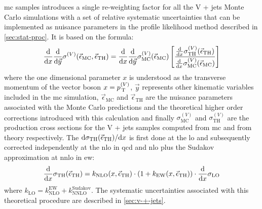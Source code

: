 \gls{mc} samples introduces a single re-weighting factor for all the V + jets
Monte Carlo simulations with a set of relative systematic uncertainties that can
be implemented as nuisance parameters in the profile likelihood method described
in \cref{sec:stat-proc}. It is based on the formula:
\begin{equation}
  \label{eq:51}
  \frac{\mathrm{d}}{\mathrm{d} x} \frac{\mathrm{d}}{\mathrm{d} \vec{y}} \sigma^{(V)}
  (\vec{\epsilon}_\mathrm{MC}, \vec{\epsilon}_\mathrm{TH}) = \frac{\mathrm{d}}{\mathrm{d} x}
  \frac{\mathrm{d}}{\mathrm{d} \vec{y}} \sigma_\mathrm{MC}^{(V)}(\vec{\epsilon}_\mathrm{MC})
  \left[ \frac{\frac{\mathrm{d}}{\mathrm{d} x}
      \sigma_\mathrm{TH}^{(V)}(\vec{\epsilon}_\mathrm{TH})}{\frac{\mathrm{d}}{\mathrm{d} x}
      \sigma_\mathrm{MC}^{(V)}(\vec{\epsilon}_\mathrm{MC})} \right]
\end{equation}
where the one dimensional parameter $x$ is understood as the transverse momentum
of the vector boson $x = p_\mathrm{\, T}^{(V)}$, $\vec{y}$ represents other kinematic
variables included in the \gls{mc} simulation, $\vec{\epsilon}_\mathrm{MC}$ and
$\vec{\epsilon}_\mathrm{TH}$ are the nuisance parameters associated with the
Monte Carlo predictions and the theoretical higher order corrections introduced
with this calculation and finally $\sigma_\mathrm{MC}^{(V)}$ and
$\sigma_\mathrm{TH}^{(V)}$ are the production cross sections for the V + jets
samples computed from \gls{mc} and from theory respectively. The
$\mathrm{d} \sigma_\mathrm{TH}(\vec{\epsilon}_\mathrm{TH})/\mathrm{d} x$ is first done at the
\gls{lo} and subsequently corrected independently at the \gls{nlo} in \gls{qcd}
and \gls{nlo} plus the Sudakov approximation at \gls{nnlo} in \gls{ew}:
\begin{equation}
  \label{eq:176}
  \frac{\mathrm{d}}{\mathrm{d} x} \sigma_\mathrm{TH}(\vec{\epsilon}_\mathrm{TH}) =
  k_\mathrm{NLO}(x, \vec{\epsilon}_\mathrm{TH}) \cdot \left(1 + k_\mathrm{EW}(x,
    \vec{\epsilon}_\mathrm{TH}) \right) \cdot \frac{\mathrm{d}}{\mathrm{d} x} \sigma_\mathrm{LO}
\end{equation}
where $k_\mathrm{LO} = k_\mathrm{NLO}^\mathrm{EW} +
k_\mathrm{NNLO}^\mathrm{Sudakov}$. The systematic uncertainties associated with
this theoretical procedure are described in \cref{sec:v-+-jets}.
